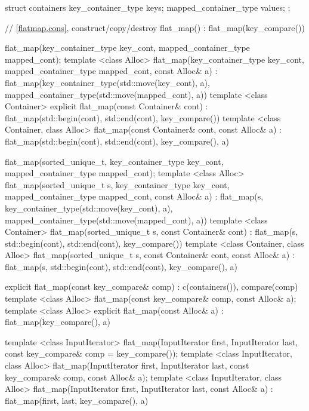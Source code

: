 \begin{codeblock}
\begin{codeblock}
\begin{codeblock}
\begin{addedblock}
\begin{codeblock}
{{    struct containers
    {
      key_container_type keys;
      mapped_container_type values;
    };

    // \ref{flatmap.cons}, construct/copy/destroy
    flat_map() : flat_map(key_compare()) { }

    flat_map(key_container_type key_cont, mapped_container_type mapped_cont);
    template <class Alloc>
    flat_map(key_container_type key_cont, mapped_container_type mapped_cont,
             const Alloc& a)
        : flat_map(key_container_type(std::move(key_cont), a),
                   mapped_container_type(std::move(mapped_cont), a))
      { }
    template <class Container>
      explicit flat_map(const Container& cont)
        : flat_map(std::begin(cont), std::end(cont), key_compare()) { }
    template <class Container, class Alloc>
      flat_map(const Container& cont, const Alloc& a)
        : flat_map(std::begin(cont), std::end(cont), key_compare(), a) { }

    flat_map(sorted_unique_t,
             key_container_type key_cont, mapped_container_type mapped_cont);
    template <class Alloc>
    flat_map(sorted_unique_t s, key_container_type key_cont,
             mapped_container_type mapped_cont, const Alloc& a)
        : flat_map(s, key_container_type(std::move(key_cont), a),
                   mapped_container_type(std::move(mapped_cont), a))
      { }
    template <class Container>
      flat_map(sorted_unique_t s, const Container& cont)
        : flat_map(s, std::begin(cont), std::end(cont), key_compare()) { }
    template <class Container, class Alloc>
      flat_map(sorted_unique_t s, const Container& cont, const Alloc& a)
        : flat_map(s, std::begin(cont), std::end(cont), key_compare(), a) { }

    explicit flat_map(const key_compare& comp)
      : c(containers()), compare(comp) { }
    template <class Alloc>
      flat_map(const key_compare& comp, const Alloc& a);
    template <class Alloc>
      explicit flat_map(const Alloc& a)
        : flat_map(key_compare(), a) { }

    template <class InputIterator>
      flat_map(InputIterator first, InputIterator last,
               const key_compare& comp = key_compare());
    template <class InputIterator, class Alloc>
      flat_map(InputIterator first, InputIterator last,
               const key_compare& comp, const Alloc& a);
    template <class InputIterator, class Alloc>
      flat_map(InputIterator first, InputIterator last,
               const Alloc& a)
        : flat_map(first, last, key_compare(), a) { }

}}
\end{codeblock}
\end{addedblock}
\end{codeblock}
\end{codeblock}
\end{codeblock}
